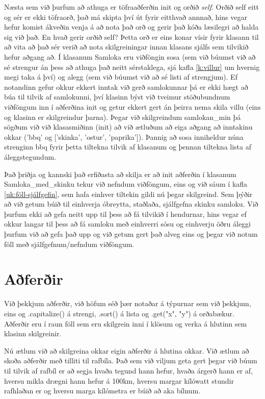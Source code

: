 Næsta sem við þurfum að athuga er töfraaðferðin init og orðið \textit{self}.
Orðið self eitt og sér er ekki töfraorð, það má skipta því út fyrir eitthvað annnað, hins vegar hefur komist ákveðin venja á að nota það orð og gerir það kóða læsilegri að halda sig við það.
En hvað gerir orðið self?
Þetta orð er eins konar vísir fyrir klasann til að vita að það sér verið að nota skilgreiningar innan klasans sjálfs sem tilvikið hefur aðgang að.
Í klasanum Samloka eru viðföngin sosa (sem við búumst við að sé strengur án þess að athuga það neitt sérstaklega, sjá kafla \ref{k:villur} um hvernig megi taka á því) og alegg (sem við búumst við að sé listi af strengjum).
Ef notandinn gefur okkur ekkert inntak við gerð samlokunnar þá er ekki hægt að búa til tilvik af samlokunni, því klasinn býst við tveimur stöðubundnum viðföngum inn í aðferðina init og getur ekkert gert án þeirra nema skila villu (eins og klasinn er skilgreindur þarna).
Þegar við skilgreindum samlokan\_min þá sögðum við við klasasmiðinn (init) að við ætluðum að eiga aðgang að inntakinu okkar ('bbq' og ['skinka', 'ostur', 'paprika']).
Þannig að sosa inniheldur núna strenginn bbq fyrir þetta tiltekna tilvik af klasanum og þennan tiltekna lista af áleggstegundum.

Það þriðja og kannski það erfiðasta að skilja er að init aðferðin í klasanum Samloka\_med\_skinku tekur við nefndum viðföngum, eins og við sáum í kafla \ref{uk:föll-sjálfgefin}, sem hafa einhver tiltekin gildi nú þegar skilgreind.
Sem þýðir að við getum búið til einhverja óbreytta, staðlaða, sjálfgefna skinku samloku.
Við þurfum ekki að gefa neitt upp til þess að fá tilvikið í hendurnar, hins vegar ef okkur langar til þess að fá samloku með einhverri sósu og einhverju öðru áleggi þurfum við að gefa það upp og við getum gert það alveg eins og þegar við notum föll með sjálfgefnum/nefndum viðföngum.

\section{Aðferðir}\label{uk:klasar-aðferðir}
Við þekkjum aðferðir, við höfum séð þær notaðar á týpurnar sem við þekkjum, eins og .capitalize() á strengi, .sort() á lista og .get("x", "y") á orðabækur.
Aðferðir eru í raun föll sem eru skilgrein inni í klösum og verka á hlutinn sem klasinn skilgreinir.

Nú ætlum við að skilgreina okkar eigin aðferðir á hlutina okkar.
Við ætlum að skoða aðferðir með tilliti til rafbíla.
Það sem við viljum geta gert þegar við búum til tilvik af rafbíl er að segja hvaða tegund hann hefur, hvaða árgerð hann er af, hversu mikla drægni hann hefur á 100km, hversu margar kílówatt stundir rafhlaðan er og hversu marga kílómetra er búið að aka bílnum.

